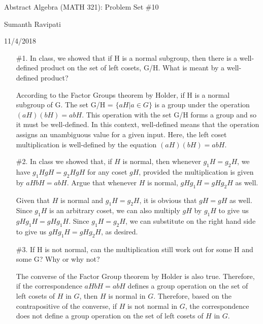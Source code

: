 \documentclass{article}
\begin{document}
%
\centerline{\Large Abstract Algebra (MATH 321): Problem Set \#10}
\centerline{Sumanth Ravipati}
\centerline{11/4/2018}

\begin{enumerate}
    \item[\#1.]In class, we showed that if H is a normal subgroup, then there is a well-defined product on the set of left cosets, G/H. What is meant by a well-defined product?
    
    \begin{flushleft}
    According to the Factor Groups theorem by Holder, if H is a normal subgroup of G. The set G/H = $\{aH | a \in G\}$ is a group under the operation $(aH)(bH) = abH$. This operation with the set G/H forms a group and so it must be well-defined. In this context, well-defined means that the operation assigns an unambiguous value for a given input. Here, the left coset multiplication is well-defined by the equation $(aH)(bH) = abH$.
    \end{flushleft}

    \item[\#2.]In class we showed that, if $H$ is normal, then whenever $g_1H = g_2H$, we have $g_1HgH = g_2HgH$ for any coset $gH$, provided the multiplication is given by $aHbH = abH$. Argue that whenever $H$ is normal, $gHg_1H = gHg_2H$ as well.
    
    \begin{flushleft}
    Given that $H$ is normal and $g_1H = g_2H$, it is obvious that $gH = gH$ as well. Since $g_1H$ is an arbitrary coset, we can also multiply $gH$ by $g_1H$ to give us $gHg_1H = gHg_1H$. Since $g_1H = g_2H$, we can substitute on the right hand side to give us  $gHg_1H = gHg_2H$, as desired.
    \end{flushleft}

    \item[\#3.]If H is not normal, can the multiplication still work out for some H and some G? Why or why not?
    
    \begin{flushleft}
    The converse of the Factor Group theorem by Holder is also true. Therefore, if the correspondence $aHbH = abH$ defines a group operation on the set of left cosets of $H$ in $G$, then $H$ is normal in $G$. Therefore, based on the contrapositive of the converse, if $H$ is not normal in $G$, the correspondence does not define a group operation on the set of left cosets of $H$ in $G$.
    \end{flushleft}


\end{enumerate}
\end{document}
